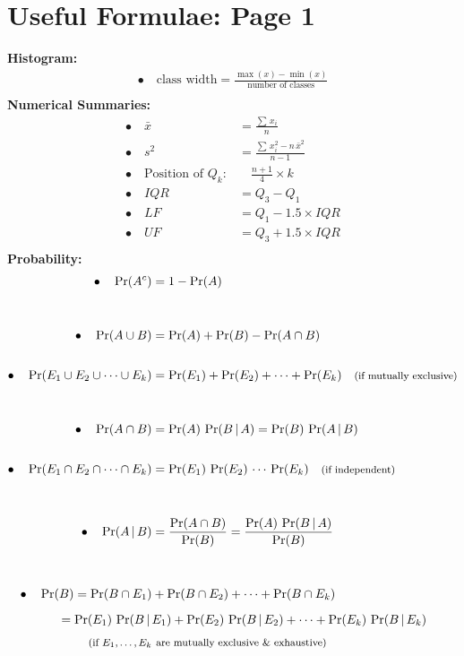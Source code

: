 \documentclass[12pt]{article}
\begin{document}
\newpage














\section*{Useful Formulae: Page 1\\[0.3cm]}
{\bf Histogram:}\\[-0.8cm]
\begin{align*}
\bullet\quad \text{class width} = \frac{\max(x) - \min(x)}{\text{number of classes}}\\
\end{align*}
{\bf Numerical Summaries:}\\[-0.8cm]
\begin{align*}
\bullet\quad \bar x &= \frac{\sum\,x_i}{n}\\[0.6cm]
\bullet\quad s^2 &= \frac{\sum\,x_i^2 - n\,\bar x^2}{n-1}\\[0.6cm]
\bullet\quad \text{Position of } Q_k:& \quad \frac{n+1}{4}\times k \\[0.6cm]
\bullet\quad IQR &= Q_3 - Q_1 \\[0.6cm]
\bullet\quad LF &= Q_1 - 1.5 \times IQR \\[0.6cm]
\bullet\quad UF &= Q_3 + 1.5 \times IQR\\
\end{align*}
{\bf Probability:}\\[-0.8cm]
\begin{align*}
\bullet\quad \Pr(A^c) &= 1 - \Pr(A) \\[1cm]
\bullet\quad \Pr(A \cup B) &= \Pr(A) + \Pr(B) - \Pr(A \cap B)\\[0.6cm]
\bullet\quad \Pr(E_1 \cup E_2 \cup \cdots \cup E_k) &= \Pr(E_1) + \Pr(E_2) + \cdots + \Pr(E_k) \text{\quad{\footnotesize(if mutually exclusive)}}\\[1cm]
\bullet\quad \Pr(A \cap B) &= \Pr(A) \, \Pr(B \, | \, A) = \Pr(B) \, \Pr(A \, | \, B) \\[0.6cm]
\bullet\quad \Pr(E_1 \cap E_2 \cap \cdots \cap E_k) &= \Pr(E_1) \, \Pr(E_2) \, \cdots \, \Pr(E_k) \text{\quad{\footnotesize(if independent)}}\\[1cm]
\bullet\quad \Pr(A\,|\,B) &= \frac{\Pr(A \cap B)}{\Pr(B)} = \frac{\Pr(A) \,\Pr(B\,|\,A)}{\Pr(B)}\\[1cm]
\bullet\quad \Pr(B) = \Pr(B \cap E_1) &+ \Pr(B \cap E_2) + \cdots + \Pr(B \cap E_k) \\[0.2cm]
= \Pr(E_1) \, \Pr(B\,|\,&E_1) + \Pr(E_2) \, \Pr(B\,|\,E_2) + \cdots + \Pr(E_k) \, \Pr(B\,|\,E_k)\\[0.1cm]
\text{{\footnotesize(if $E_1,\ldots, E_k$}} & \,\, \text{{\footnotesize are mutually exclusive \& exhaustive)}}
\end{align*}
\end{document}
